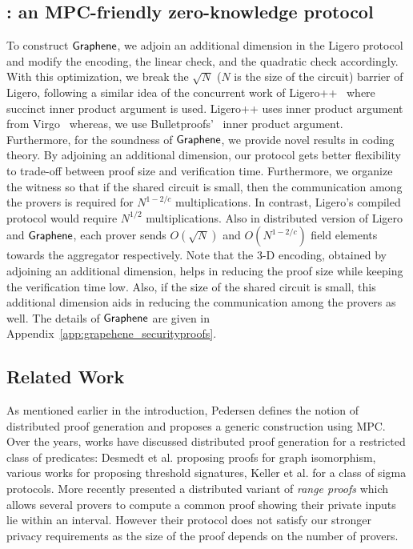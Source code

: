 \subsection{\name{}: an MPC-friendly zero-knowledge protocol}
To construct $\textsf{Graphene}$, we adjoin an additional dimension in the Ligero protocol and modify the encoding, the linear check, and the quadratic check accordingly. With this optimization, we break the $\sqrt{N}$ ($N$ is the size of the circuit) barrier of Ligero, following a similar idea of the concurrent work of Ligero++~\cite{ligero++} where succinct inner product argument is used. Ligero++ uses inner product argument from Virgo~\cite{Virgo} whereas, we use Bulletproofs'~\cite{bulletproofs} inner product argument. Furthermore, for the soundness of $\textsf{Graphene}$, we provide novel results in coding theory. By adjoining an additional dimension, our protocol gets better flexibility to trade-off between proof size and verification time. Furthermore, we organize the witness so that if the shared circuit is small, then the communication among the provers is required for $N^{1-2/c}$ multiplications. In contrast, Ligero's compiled protocol would require $N^{1/2}$ multiplications. Also in distributed version of Ligero and $\textsf{Graphene}$, each prover sends $O(\sqrt{N})$ and $O(N^{1-2/c})$ field elements towards the aggregator respectively. Note that the 3-D encoding, obtained by adjoining an additional dimension, helps in reducing the proof size while keeping the verification time low. Also, if the size of the shared circuit is small, this additional dimension aids in reducing the communication among the provers as well. The details of $\textsf{Graphene}$ are given in Appendix~\ref{app:grapehene_securityproofs}.

\subsection{Related Work}\label{sec:relatedwork}
As mentioned earlier in the introduction, Pedersen \cite{Ped92} defines the
notion of distributed proof generation and proposes a generic construction using
MPC. Over the years, works have discussed distributed proof generation for a
restricted class of predicates: Desmedt et al. \cite{DDB94} proposing proofs for
graph isomorphism, various works \cite{King05, DDS, Desmedt2011} for proposing
threshold signatures, Keller et al. \cite{EfficientTZ} for a class of sigma
protocols. 
More recently \cite{bulletproofs} presented a distributed variant of {\em range proofs} which allows
several provers to compute a common proof showing their private inputs lie within an interval. However their protocol
does not satisfy our stronger privacy requirements as the size of the proof depends on the number of provers.

